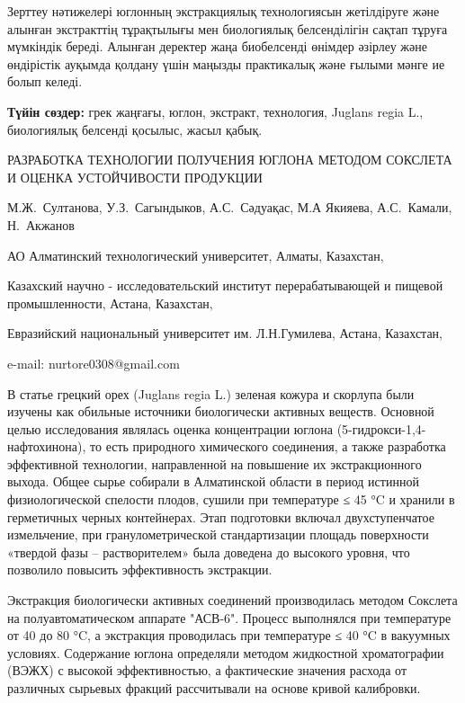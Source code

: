 Зерттеу нәтижелері юглонның экстракциялық технологиясын жетілдіруге және
алынған экстракттің тұрақтылығы мен биологиялық белсенділігін сақтап
тұруға мүмкіндік береді. Алынған деректер жаңа биобелсенді өнімдер
әзірлеу және өндірістік ауқымда қолдану үшін маңызды практикалық және
ғылыми мәнге ие болып келеді.

{\bfseries Түйін сөздер:} грек жаңғағы, юглон, экстракт, технология,
Juglans regia L., биологиялық белсенді қосылыс, жасыл қабық.

\begin{header}
РАЗРАБОТКА ТЕХНОЛОГИИ ПОЛУЧЕНИЯ ЮГЛОНА МЕТОДОМ СОКСЛЕТА И ОЦЕНКА УСТОЙЧИВОСТИ ПРОДУКЦИИ

М.Ж.~Султанова,
У.З.~Сагындыков,
А.С.~Сәдуақас,
М.А Якияева,
А.С.~Камали,
Н.~Акжанов\envelope
\end{header}

\begin{affil}
АО Алматинский технологический университет, Алматы, Казахстан,

Казахский научно - исследовательский институт перерабатывающей и пищевой промышленности, Астана, Казахстан,

Евразийский национальный университет им. Л.Н.Гумилева, Астана, Казахстан,

e-mail: nurtore0308@gmail.com
\end{affil}

В статье грецкий орех (Juglans regia L.) зеленая кожура и скорлупа были
изучены как обильные источники биологически активных веществ. Основной
целью исследования являлась оценка концентрации юглона
(5-гидрокси-1,4-нафтохинона), то есть природного химического соединения,
а также разработка эффективной технологии, направленной на повышение их
экстракционного выхода. Общее сырье собирали в Алматинской области в
период истинной физиологической спелости плодов, сушили при температуре
≤ 45 °C и хранили в герметичных черных контейнерах. Этап подготовки
включал двухступенчатое измельчение, при гранулометрической
стандартизации площадь поверхности «твердой фазы -- растворителем» была
доведена до высокого уровня, что позволило повысить эффективность
экстракции.

Экстракция биологически активных соединений производилась методом
Сокслета на полуавтоматическом аппарате "АСВ-6". Процесс выполнялся при
температуре от 40 до 80 °C, а экстракция проводилась при температуре ≤
40 °C в вакуумных условиях. Содержание юглона определяли методом
жидкостной хроматографии (ВЭЖХ) с высокой эффективностью, а фактические
значения расхода от различных сырьевых фракций рассчитывали на основе
кривой калибровки.

